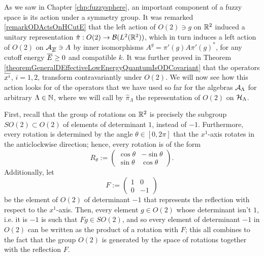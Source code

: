 \lin 

As we saw in Chapter \ref{chp:fuzzysphere}, an important component of a fuzzy space is its action under a symmetry group. It was remarked \ref{remarkODActsOnHCutE} that the left action of $O(2) \ni g$ on $\mathbb{R}^2$ induced a unitary representation $\hat \pi: O(2) \to \mathcal B(L^2(\mathbb{R}^2))$, which in turn induces a left action of $O(2)$ on $\mathcal A_{\overline{E}} \ni A$ by inner isomorphisms $A^g = \pi'(g) A \pi'(g)^*$, for any cutoff energy $\overline{E} \geq 0$ and compatible $k$. It was further proved in Theorem \ref{theoremGeneralDEffectiveLowEnergyQuantumIsODCovariant} that the operators $\overline{x^i}$, $i = 1, 2$, transform contravariantly under $O(2)$. We will now see how this action looks for of the operators that we have used so far for the algebras $\mathcal A_\Lambda$ for arbitrary $\Lambda \in \mathbb{N}$, where we will call by $\hat \pi_\Lambda$ the representation of $O(2)$ on $\mathcal H_\Lambda$.%

First, recall that the group of rotations on $\mathbb{R}^2$ is precisely the subgroup $SO(2) \subset O(2)$ of elements of determinant $1$, instead of $-1$. Furthermore, every rotation is determined by the angle $\theta \in [0, 2\pi]$ that the $x^1$-axis rotates in the anticlockwise direction; hence, every rotation is of the form
\begin{equation}\label{equationGEneral2DRotationTheta}
    R_\theta := 
    \begin{pmatrix}
    \cos \theta & -\sin \theta \\
    \sin \theta & \cos \theta
    \end{pmatrix}.
\end{equation}
Additionally, let
\begin{equation}
    F := \begin{pmatrix}
    1 & 0 \\
    0 & -1
    \end{pmatrix}
\end{equation} be the element of $O(2)$ of determinant $-1$ that represents the reflection with respect to the $x^1$-axis. Then, every element $g \in O(2)$ whose determinant isn't $1$, i.e. it is $-1$ is such that $Fg \in SO(2)$, and so every element of determinant $-1$ in $O(2)$ can be written as the product of a rotation with $F$; this all combines to the fact that the group $O(2)$ is generated by the space of rotations together with the reflection $F$.

